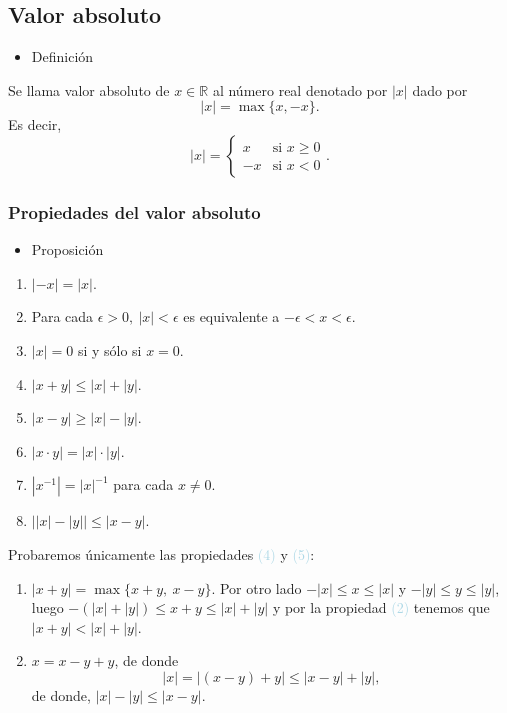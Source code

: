 \documentclass[12pt]{article}
\begin{document}
\subsection{Valor absoluto}
\begin{itemize}[label=\color{red}\textbullet, leftmargin=*]
	\item \color{lightblue}Definición
\end{itemize}
Se llama valor absoluto de $x\in\mathbb{R}$ al número real denotado por $|x|$ dado por \[ |x|=\max\{x,-x\} .\]
Es decir, \[ |x|=\left\lbrace\begin{array}{cl}
	x & \text{si }x\ge0\\
	-x & \text{si }x<0
\end{array}\right. .\]
\subsubsection{Propiedades del valor absoluto}
\begin{itemize}[label=\color{red}\textbullet, leftmargin=*]
	\item \color{lightblue}Proposición
\end{itemize}
\begin{enumerate}[label=\arabic*)]
	\item $|-x|=|x|$.
	\item Para cada $\epsilon>0,~|x|<\epsilon$ es equivalente a $-\epsilon<x<\epsilon$.
	\item $|x|=0$ si y sólo si $x=0$.
	\item $|x+y|\le |x|+|y|$.
	\item $|x-y|\ge|x|-|y|$.
	\item $|x\cdot y|=|x|\cdot|y|$.
	\item $|x^{-1}|=|x|^{-1}$ para cada $x\neq0$.
	\item $\left||x|-|y|\right|\le|x-y|$.
\end{enumerate}
Probaremos únicamente las propiedades \textcolor{lightblue}{(4)} y \textcolor{lightblue}{(5)}:
\begin{enumerate}[label=\arabic*)]
	\item $|x+y|=\max\{x+y,~x-y\}$. Por otro lado $-|x|\le x\le |x|$ y $-|y|\le y\le |y|$, luego $-\left(|x|+|y|\right)\le x+y\le |x|+|y|$ y por la propiedad \textcolor{lightblue}{(2)} tenemos que $|x+y|<|x|+|y|$.
	\item $x=x-y+y$, de donde \[ |x|=\left|(x-y)+y\right|\le|x-y|+|y|, \]de donde, $|x|-|y|\le|x-y|$.
\end{enumerate}
\end{document}
